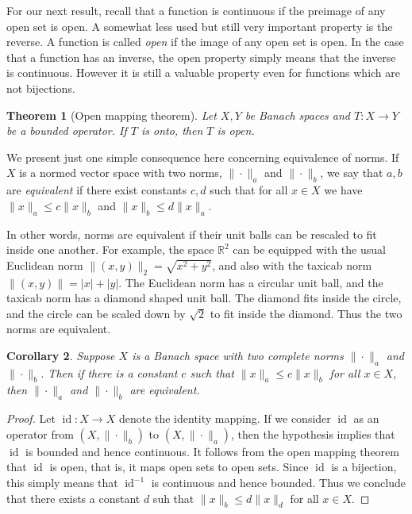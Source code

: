 \documentclass[11pt,oneside]{amsbook}
\newcommand{\RR}{{\mathbb R}}
\DeclareMathOperator{\id}{id}
\theoremstyle{definition}
\theoremstyle{plain}
\newtheorem{thm}{Theorem}[section]
\newtheorem{cor}[thm]{Corollary}
\theoremstyle{definition}
\theoremstyle{remark}
\numberwithin{equation}{section}
\numberwithin{figure}{section}
\begin{document}
For our next result, recall that a function is continuous if the preimage of any open set is open. A somewhat less used but still very important property is the reverse. A function is called \emph{open} if the image of any open set is open. In the case that a function has an inverse, the open property simply means that the inverse is continuous. However it is still a valuable property even for functions which are not bijections.

\begin{thm}[Open mapping theorem]
  Let $X,Y$ be Banach spaces and $T\colon X\to Y$ be a bounded operator. If $T$ is onto, then $T$ is open.
\end{thm}

We present just one simple consequence here concerning equivalence of norms. If $X$ is a normed vector space with two norms, $\|\cdot\|_a$ and $\|\cdot\|_b$, we say that $a,b$ are \emph{equivalent} if there exist constants $c,d$ such that for all $x\in X$ we have $\|x\|_a\leq c\|x\|_b$ and $\|x\|_b\leq d\|x\|_a$.

In other words, norms are equivalent if their unit balls can be rescaled to fit inside one another. For example, the space $\RR^2$ can be equipped with the usual Euclidean norm $\|(x,y)\|_2=\sqrt{x^2+y^2}$, and also with the taxicab norm $\|(x,y)\|=|x|+|y|$. The Euclidean norm has a circular unit ball, and the taxicab norm has a diamond shaped unit ball. The diamond fits inside the circle, and the circle can be scaled down by $\sqrt2$ to fit inside the diamond. Thus the two norms are equivalent.

\begin{cor}
  Suppose $X$ is a Banach space with two complete norms $\|\cdot\|_a$ and $\|\cdot\|_b$. Then if there is a constant $c$ such that $\|x\|_a\leq c\|x\|_b$ for all $x\in X$, then $\|\cdot\|_a$ and $\|\cdot\|_b$ are equivalent.
\end{cor}

\begin{proof}
  Let $\id\colon X\to X$ denote the identity mapping. If we consider $\id$ as an operator from $(X,\|\cdot\|_b)$ to $(X,\|\cdot\|_a)$, then the hypothesis implies that $\id$ is bounded and hence continuous. It follows from the open mapping theorem that $\id$ is open, that is, it maps open sets to open sets. Since $\id$ is a bijection, this simply means that $\id^{-1}$ is continuous and hence bounded. Thus we conclude that there exists a constant $d$ suh that $\|x\|_b\leq d\|x\|_d$ for all $x\in X$.
\end{proof}
\end{document}
